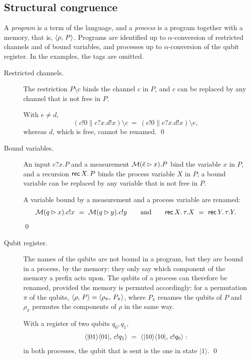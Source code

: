 \subsection{Structural congruence}

A \emph{program} is a term of the language, and a \emph{process} is a
program together with a memory, that is, $\langle \rho ,\, P \rangle$.
Programs are identified up to $\alpha$-conversion of restricted channels and
of bound variables, and processes up to $\alpha$-conversion of the qubit
register. In the examples, the tags are omitted.
\begin{description}
\item[Restricted channels.] The restriction $P \setminus c$ binds the channel
  $c$ in $P$, and $c$ can be replaced by any channel that is not free in $P$.
  \begin{example}
  With $e \neq d$,
  \[
  (c!0 \parallel c?x.d!x) \setminus c
  \ =\
  (e!0 \parallel e?x.d!x) \setminus e ,
  \]
  whereas $d$, which is free, cannot be renamed.
  \qed
  \end{example}
\item[Bound variables.] An input $c?x.P$ and a measurement
  $\mathcal{M}(\tilde e \rhd x).P$ bind the variable $x$ in $P$, and a
  recursion $\mathsf{rec}\,X.\,P$ binds the process variable $X$ in $P$;
  a bound variable can be replaced by any variable that is not free in $P$.
  \begin{example}
  A variable bound by a measurement and a process variable are renamed:
  \[
  \mathcal{M}(q \rhd x).c!x \ =\ \mathcal{M}(q \rhd y).c!y
  \qquad\text{and}\qquad
  \mathsf{rec}\,X.\,\tau.X \ =\ \mathsf{rec}\,Y.\,\tau.Y .
  \]
  \qed
  \end{example}
\item[Qubit register.] The names of the qubits are not bound in a program,
  but they are bound in a process, by the memory: they only say which
  component of the memory a prefix acts upon. The qubits of a process can
  therefore be renamed, provided the memory is permuted accordingly: for a
  permutation $\pi$ of the qubits,
  $\langle \rho ,\, P \rangle = \langle \rho_\pi ,\, P_\pi \rangle$, where $P_\pi$ renames the
  qubits of $P$ and $\rho_\pi$ permutes the components of $\rho$ in the
  same way.
  \begin{example}
  With a register of two qubits $q_0, q_1$,
  \[
  \langle |01\rangle\langle 01| ,\, c!q_1 \rangle
  \ =\
  \langle |10\rangle\langle 10| ,\, c!q_0 \rangle :
  \]
  in both processes, the qubit that is sent is the one in state $|1\rangle$.
  \qed
  \end{example}
\end{description}

